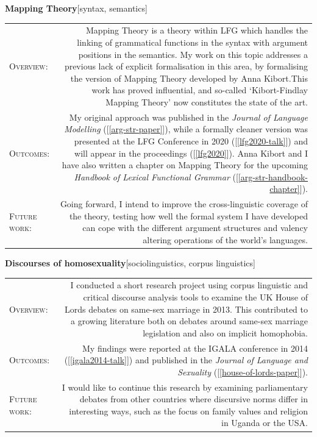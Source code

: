 \documentclass[11pt,a4paper]{article}
\makeatletter
\newlength{\rulelength}%
\newcommand{\REx}[2]{%
\vspace*{0.1\baselineskip}%
{\large\textbf{#1}\hfill\textnormal{[#2]}}%
\vspace*{0.5\baselineskip}%
}
\newenvironment{cvsection}{%
  \setlength{\extrarowheight}{0.70ex}
  \begin{longtable}[l]{@{} L R @{}}
}{%
  \end{longtable}
}
\newcommand{\sref}[1]{[\ref{#1}]}
\newcommand{\researchsubhead}[1]{%
\textsc{#1}:%
}
\makeatother
\begin{document}
\REx{Mapping Theory}{syntax, semantics}
\begin{cvsection}
  \researchsubhead{Overview} &%
  Mapping Theory is a theory within LFG which handles the linking of grammatical
  functions in the syntax with argument positions in the semantics. My work on
  this topic addresses a previous lack of explicit formalisation in this area,
  by formalising the version of Mapping Theory developed by Anna Kibort.This
  work has proved influential, and so-called `Kibort-Findlay Mapping Theory' now
  constitutes the state of the art.
  \\
  \researchsubhead{Outcomes} &%
  My original approach was published in the \textit{Journal of Language
    Modelling} (\sref{arg-str-paper}), while a formally cleaner version was
  presented at the LFG Conference in 2020 (\sref{lfg2020-talk}) and will appear
  in the proceedings (\sref{lfg2020}). Anna Kibort and I have also written a
  chapter on Mapping Theory for the upcoming \textit{Handbook of Lexical
    Functional Grammar} (\sref{arg-str-handbook-chapter}).
  \\
  \researchsubhead{Future work} &%
  Going forward, I intend to improve the cross-linguistic coverage of the
  theory, testing how well the formal system I have developed can cope with the
  different argument structures and valency altering operations of the world's
  languages.
\end{cvsection}

\REx{Discourses of homosexuality}{sociolinguistics, corpus linguistics}
\begin{cvsection}
  \researchsubhead{Overview} &%
  I conducted a short research project using corpus linguistic and critical discourse analysis tools to examine the UK House of Lords debates on same-sex marriage in 2013. This contributed to a growing literature both on debates around same-sex marriage legislation and also on implicit homophobia.%
\\
  \researchsubhead{Outcomes} &%
  My findings were reported at the IGALA conference in 2014 (\sref{igala2014-talk}) and published in the \textit{Journal of Language and Sexuality} (\sref{house-of-lords-paper}).%
\\
  \researchsubhead{Future work} &%
  I would like to continue this research by examining parliamentary debates from other countries where discursive norms differ in interesting ways, such as the focus on family values and religion in Uganda or the USA.
\end{cvsection}
\end{document}
